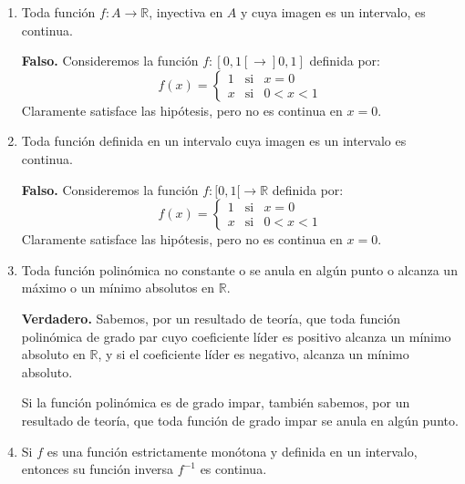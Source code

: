 \documentclass[10pt,a4paper]{article}
\begin{document}
	\vspace{1 cm}
	
	\justify
	
	\begin{enumerate}
		\item Toda función $f: A \rightarrow \mathbb{R}$, inyectiva en $A$ y cuya imagen es un intervalo, es continua.
		
		\textbf{Falso. }Consideremos la función $f : [0, 1[ \rightarrow ]0, 1]$ definida por:
		\begin{equation*}
			f(x)= \left\{ \begin{array}{lcc}
				1 &   \text{si}  & x = 0 \\
				x & \text{si} & 0 < x < 1 
			\end{array}
			\right.
		\end{equation*}
		Claramente satisface las hipótesis, pero no es continua en $x = 0$. \newline
		
		\item Toda función definida en un intervalo cuya imagen es un intervalo es continua.
		
		\textbf{Falso. }Consideremos la función $f : [0, 1[ \rightarrow \mathbb{R}$ definida por:
		\begin{equation*}
			f(x)= \left\{ \begin{array}{lcc}
				1 &   \text{si}  & x = 0 \\
				x &  \text{si} & 0 < x < 1
			\end{array}
			\right.
		\end{equation*}
		Claramente satisface las hipótesis, pero no es continua en $x = 0$. \newline
		
		\item Toda función polinómica no constante o se anula en algún punto o alcanza un máximo o un mínimo absolutos en $\mathbb{R}$.
		
		\textbf{Verdadero. }Sabemos, por un resultado de teoría, que toda función polinómica de grado par cuyo coeficiente líder es positivo alcanza un mínimo absoluto en $\mathbb{R}$, y si el coeficiente líder es negativo, alcanza un mínimo absoluto.
		
		Si la función polinómica es de grado impar, también sabemos, por un resultado de teoría, que toda función de grado impar se anula en algún punto. \newline
		
		\item Si $f$ es una función estrictamente monótona y definida en un intervalo, entonces su función inversa $f^{-1}$ es continua.	
		

\end{enumerate}
\end{document}
